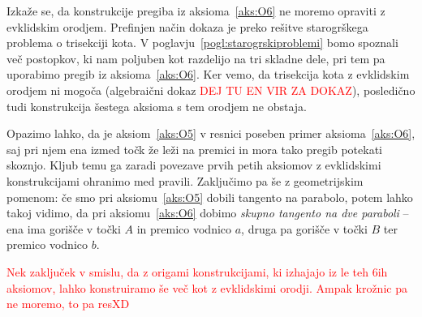 Izkaže se, da konstrukcije pregiba iz aksioma~\ref{aks:O6} ne moremo opraviti z evklidskim orodjem. Prefinjen način dokaza je preko rešitve starogrškega problema o trisekciji kota. V poglavju~\ref{pogl:starogrskiproblemi} bomo spoznali več postopkov, ki nam poljuben kot razdelijo na tri skladne dele, pri tem pa uporabimo pregib iz aksioma~\ref{aks:O6}. Ker vemo, da trisekcija kota z evklidskim orodjem ni mogoča (algebraični dokaz \textcolor{red}{DEJ TU EN VIR ZA DOKAZ}), posledično tudi konstrukcija šestega aksioma s tem orodjem ne obstaja.

Opazimo lahko, da je aksiom~\ref{aks:O5} v resnici poseben primer aksioma~\ref{aks:O6}, saj pri njem ena izmed točk že leži na premici in mora tako pregib potekati skoznjo. Kljub temu ga zaradi povezave prvih petih aksiomov z evklidskimi konstrukcijami ohranimo med pravili. Zaključimo pa še z geometrijskim pomenom: če smo pri aksiomu~\ref{aks:O5} dobili tangento na parabolo, potem lahko takoj vidimo, da pri aksiomu~\ref{aks:O6} dobimo \emph{skupno tangento na dve paraboli} -- ena ima gorišče v točki $A$ in premico vodnico $a$, druga pa gorišče v točki $B$ ter premico vodnico $b$.

\textcolor{red}{Nek zaključek v smislu, da z origami konstrukcijami, ki izhajajo iz le teh 6ih aksiomov, lahko konstruiramo še več kot z evklidskimi orodji. Ampak krožnic pa ne moremo, to pa resXD}